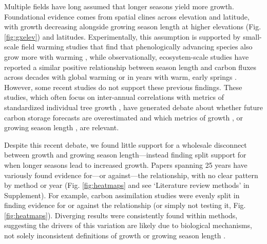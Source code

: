 \documentclass[11pt]{article}
\begin{document}
Multiple fields have long assumed that longer seasons yield more growth. Foundational evidence comes from spatial clines across elevation and latitude, with growth decreasing alongside growing season length at higher elevations (Fig. \ref{fig:gxelev}) and latitudes. Experimentally, this assumption is supported by small-scale field warming studies that find that phenologically advancing species also grow more with warming \citep[][]{Cleland:2012}, while observationally, ecosystem-scale studies have reported a similar positive relationship between season length and carbon fluxes across decades with global warming \citep{keenan2014net} or in years with warm, early springs \citep{chen1999effects}. However, some recent studies do not support these previous findings.  These studies, which often focus on inter-annual correlations with metrics of standardized individual tree growth \citep{dow2022warm,silvestro2023longer}, have generated debate about whether future carbon storage forecasts are overestimated and which metrics of growth \citep{green2022limits}, or growing season length \citep{korner2023four}, are relevant.

Despite this recent debate, we found little support for a wholesale disconnect between growth and growing season length---instead finding split support for when longer seasons lead to increased growth. Papers spanning 25 years have variously found evidence for---or against---the relationship, with no clear pattern by method or year (Fig. \ref{fig:heatmaps} and see `Literature review methods' in Supplement). For example, carbon assimilation studies were evenly split in finding evidence for or against the relationship  (or simply not testing it, Fig. \ref{fig:heatmaps}). Diverging results were consistently found within methods, suggesting the drivers of this variation are likely due to biological mechanisms, not solely inconsistent definitions of growth or growing season length \citep[as some, e.g. ][have recently suggested]{green2022limits,korner2023four}. 
\end{document}
